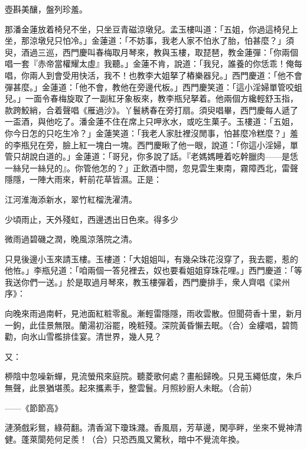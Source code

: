 壺斟美釀，盤列珍羞。

那潘金蓮放着椅兒不坐，只坐豆青磁涼墩兒。孟玉樓叫道：「五姐，你過這椅兒上坐，那涼墩兒只怕冷。」金蓮道：「不妨事，我老人家不怕氷了胎，怕甚麼？」{}須臾，酒過三巡，西門慶叫春梅取月琴來，教與玉樓，取琵琶，教金蓮彈：「你兩個唱一套『赤帝當權耀太虛』我聽。」金蓮不肯，說道：「我兒，誰養的你恁乖！俺每唱，你兩人到會受用快活，我不！也教李大姐拏了樁樂器兒。」{}西門慶道：「他不會彈甚麼。」金蓮道：「他不會，教他在旁邊代板。」西門慶笑道：「這小淫婦單管咬蛆兒。」一面令春梅旋取了一副紅牙象板來，教李瓶兒拏着。他兩個方纔輕舒玉指，款跨鮫綃，合着聲唱《雁過沙》。丫鬟綉春在旁打扇。須臾唱畢，西門慶每人遞了一盃酒，與他吃了。潘金蓮不住在席上只呷氷水，或吃生菓子。玉樓道：「五姐，你今日怎的只吃生冷？」金蓮笑道：「我老人家肚裡沒閒事，怕甚麼冷糕麼？」{}羞的李瓶兒在旁，臉上紅一塊白一塊。西門慶瞅了他一眼，說道：「你這小淫婦，單管只胡說白道的。」金蓮道：「哥兒，你多說了話。『老媽媽睡着吃幹臘肉——是恁一絲兒一絲兒的』。你管他怎的？」正飲酒中間，忽見雲生東南，霧障西北，雷聲隱隱，一陣大雨來，軒前花草皆濕。正是：

江河淮海添新水，翠竹紅榴洗濯清。

少頃雨止，天外殘虹，西邊透出日色來。得多少

微雨過碧磯之潤，晚風涼落院之清。

只見後邊小玉來請玉樓。玉樓道：「大姐姐叫，有幾朵珠花沒穿了，我去罷，惹的他恠。」李瓶兒道：「咱兩個一答兒裡去，奴也要看姐姐穿珠花哩。」西門慶道：「等我送你們一送。」於是取過月琴來，教玉樓彈着，西門慶排手，衆人齊唱《梁州序》：

向晚來雨過南軒，見池面紅粧零亂。漸輕雷隱隱，雨收雲散。但聞荷香十里，新月一鉤，此佳景無限。蘭湯初浴罷，晚粧殘。深院黃昏懶去眠。（合）金縷唱，碧筒勸，向氷山雪檻排佳宴。清世界，幾人見？

又：

桺陰中忽噪新蟬，見流螢飛來庭院。聽菱歌何處？畫船歸晚。只見玉繩低度，朱戶無聲，此景猶堪羨。起來攜素手，整雲鬟。月照紗廚人未眠。（合前）

——《節節高》

漣漪戲彩鴛，綠荷翻。清香瀉下瓊珠濺。香風扇，芳草邊，閑亭畔，坐來不覺神清健。蓬萊閬苑何足羨！（合）只恐西風又驚秋，暗中不覺流年換。

